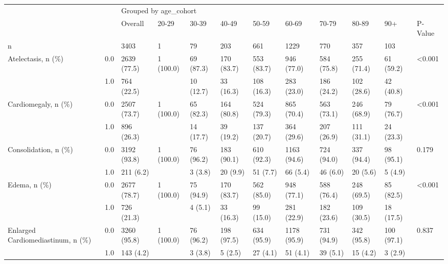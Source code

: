 \begin{tabular}{llllllllllll}
\toprule
                       &     & \multicolumn{10}{l}{Grouped by age\_cohort} \\
                       &     &               Overall &      20-29 &       30-39 &       40-49 &       50-59 &        60-69 &       70-79 &       80-89 &          90+ & P-Value \\
\midrule
n & {} &                  3403 &          1 &          79 &         203 &         661 &         1229 &         770 &         357 &          103 &         \\
Atelectasis, n (\%) & 0.0 &           2639 (77.5) &  1 (100.0) &   69 (87.3) &  170 (83.7) &  553 (83.7) &   946 (77.0) &  584 (75.8) &  255 (71.4) &    61 (59.2) &  <0.001 \\
                       & 1.0 &            764 (22.5) &            &   10 (12.7) &   33 (16.3) &  108 (16.3) &   283 (23.0) &  186 (24.2) &  102 (28.6) &    42 (40.8) &         \\
Cardiomegaly, n (\%) & 0.0 &           2507 (73.7) &  1 (100.0) &   65 (82.3) &  164 (80.8) &  524 (79.3) &   865 (70.4) &  563 (73.1) &  246 (68.9) &    79 (76.7) &  <0.001 \\
                       & 1.0 &            896 (26.3) &            &   14 (17.7) &   39 (19.2) &  137 (20.7) &   364 (29.6) &  207 (26.9) &  111 (31.1) &    24 (23.3) &         \\
Consolidation, n (\%) & 0.0 &           3192 (93.8) &  1 (100.0) &   76 (96.2) &  183 (90.1) &  610 (92.3) &  1163 (94.6) &  724 (94.0) &  337 (94.4) &    98 (95.1) &   0.179 \\
                       & 1.0 &             211 (6.2) &            &     3 (3.8) &    20 (9.9) &    51 (7.7) &     66 (5.4) &    46 (6.0) &    20 (5.6) &      5 (4.9) &         \\
Edema, n (\%) & 0.0 &           2677 (78.7) &  1 (100.0) &   75 (94.9) &  170 (83.7) &  562 (85.0) &   948 (77.1) &  588 (76.4) &  248 (69.5) &    85 (82.5) &  <0.001 \\
                       & 1.0 &            726 (21.3) &            &     4 (5.1) &   33 (16.3) &   99 (15.0) &   281 (22.9) &  182 (23.6) &  109 (30.5) &    18 (17.5) &         \\
Enlarged Cardiomediastinum, n (\%) & 0.0 &           3260 (95.8) &  1 (100.0) &   76 (96.2) &  198 (97.5) &  634 (95.9) &  1178 (95.9) &  731 (94.9) &  342 (95.8) &   100 (97.1) &   0.837 \\
                       & 1.0 &             143 (4.2) &            &     3 (3.8) &     5 (2.5) &    27 (4.1) &     51 (4.1) &    39 (5.1) &    15 (4.2) &      3 (2.9) &         \\

\end{tabular}
